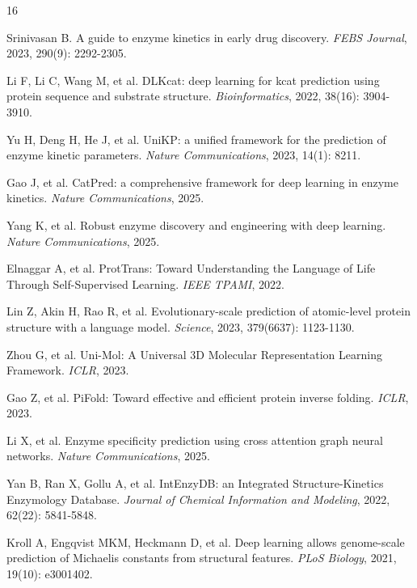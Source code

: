 \documentclass[11pt]{article}
\begin{document}
\begin{thebibliography}{16}

Srinivasan B. A guide to enzyme kinetics in early drug discovery. \textit{FEBS Journal}, 2023, 290(9): 2292-2305.

Li F, Li C, Wang M, et al. DLKcat: deep learning for kcat prediction using protein sequence and substrate structure. \textit{Bioinformatics}, 2022, 38(16): 3904-3910.

Yu H, Deng H, He J, et al. UniKP: a unified framework for the prediction of enzyme kinetic parameters. \textit{Nature Communications}, 2023, 14(1): 8211.

Gao J, et al. CatPred: a comprehensive framework for deep learning in enzyme kinetics. \textit{Nature Communications}, 2025.

Yang K, et al. Robust enzyme discovery and engineering with deep learning. \textit{Nature Communications}, 2025.

Elnaggar A, et al. ProtTrans: Toward Understanding the Language of Life Through Self-Supervised Learning. \textit{IEEE TPAMI}, 2022.

Lin Z, Akin H, Rao R, et al. Evolutionary-scale prediction of atomic-level protein structure with a language model. \textit{Science}, 2023, 379(6637): 1123-1130.

Zhou G, et al. Uni-Mol: A Universal 3D Molecular Representation Learning Framework. \textit{ICLR}, 2023.

Gao Z, et al. PiFold: Toward effective and efficient protein inverse folding. \textit{ICLR}, 2023.

Li X, et al. Enzyme specificity prediction using cross attention graph neural networks. \textit{Nature Communications}, 2025.

Yan B, Ran X, Gollu A, et al. IntEnzyDB: an Integrated Structure-Kinetics Enzymology Database. \textit{Journal of Chemical Information and Modeling}, 2022, 62(22): 5841-5848.

Kroll A, Engqvist MKM, Heckmann D, et al. Deep learning allows genome-scale prediction of Michaelis constants from structural features. \textit{PLoS Biology}, 2021, 19(10): e3001402.


\end{thebibliography}
\end{document}
